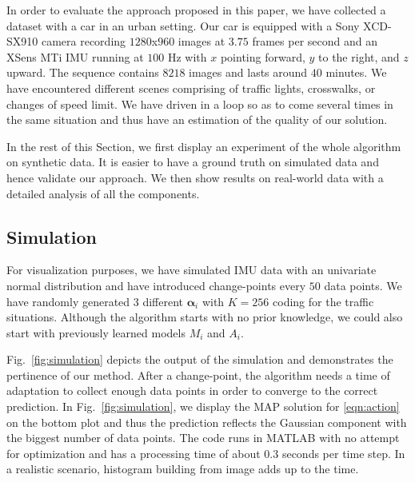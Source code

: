 In order to evaluate the approach proposed in this paper, we have collected
a dataset with a car in an urban setting. Our car is equipped with a Sony
XCD-SX910 camera recording $1280$x$960$ images at $3.75$ frames per second and
an XSens MTi IMU running at $100$ Hz with $x$ pointing forward, $y$ to the
right, and $z$ upward. The sequence contains $8218$ images and lasts around $40$
minutes. We have encountered different scenes comprising of traffic lights,
crosswalks, or changes of speed limit. We have driven in a loop so as to come
several times in the same situation and thus have an estimation of the quality
of our solution.

In the rest of this Section, we first display an experiment of the whole
algorithm on synthetic data. It is easier to have a ground truth on simulated
data and hence validate our approach. We then show results on real-world data
with a detailed analysis of all the components.

\subsection{Simulation}
For visualization purposes, we have simulated IMU data with an univariate normal
distribution and have introduced change-points every $50$ data points. We have
randomly generated 3 different $\boldsymbol{\alpha}_i$ with $K=256$ coding for
the traffic situations. Although the algorithm starts with no prior knowledge,
we could also start with previously learned models $M_i$ and $A_i$.

Fig.~\ref{fig:simulation} depicts the output of the simulation and demonstrates
the pertinence of our method. After a change-point, the algorithm needs a time
of adaptation to collect enough data points in order to converge to the correct
prediction. In Fig.~\ref{fig:simulation}, we display the MAP solution for
\eqref{eqn:action} on the bottom plot and thus the prediction reflects the
Gaussian component with the biggest number of data points. The code runs in
MATLAB with no attempt for optimization and has a processing time of about
$0.3$ seconds per time step. In a realistic scenario, histogram building from
image adds up to the time.

